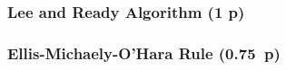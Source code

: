 \subsubsection{Lee and Ready Algorithm (1 p)}\label{sec:lee-and-ready-algorithm}








\subsubsection{Ellis-Michaely-O'Hara
  Rule (0.75~p)}\label{sec:ellis-michaely-ohara-rule}




